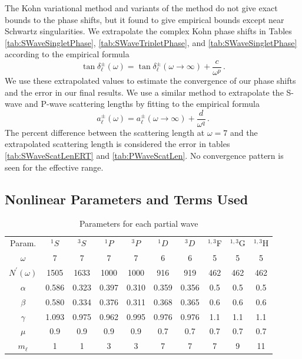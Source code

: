 \documentclass[preprint,showpacs,showkeys,preprintnumbers,amsmath,amssymb,longbibliography,pra,aps]{revtex4-1}
\begin{document}
The Kohn variational method and variants of the method do not give exact
bounds to the phase shifts, but it found to give empirical bounds except
near Schwartz singularities. We extrapolate the complex Kohn phase shifts
in Tables \ref{tab:SWaveSingletPhase}, \ref{tab:SWaveTripletPhase}, and
\ref{tab:SWaveSingletPhase} according to the empirical formula
\cite{Armour1991,VanReeth2003}
\begin{equation}
\label{eq:Extrap}
\tan\delta_\ell^\pm(\omega) = \tan\delta_\ell^\pm(\omega\to\infty) +
  \frac{c}{\omega^p}\, .
\end{equation}
We use these extrapolated values to estimate the convergence of our phase 
shifts and the error in our final results. We use a similar method to
extrapolate the S-wave and P-wave scattering lengths by fitting to the
empirical formula \cite{VanReeth2003}
\begin{equation}
\label{eq:ExtrapA}
a_\ell^\pm(\omega) = a_\ell^\pm(\omega\to\infty) + \frac{d}{\omega^q}\, .
\end{equation}
The percent difference between the scattering length at $\omega = 7$
and the extrapolated scattering 
length is considered the error in tables \ref{tab:SWaveScatLenERT} and
\ref{tab:PWaveScatLen}. No convergence pattern is seen for the effective range.

\subsection{Nonlinear Parameters and Terms Used}
\label{sec:Parameters}

\begin{table}[H]
  \centering
	\begin{ruledtabular}
    \begin{tabular}{cccccccccc}
    Param. & $^1S$ & $^3S$ & $^1P$ & $^3P$ & $^1D$ & $^3D$ & $^{1,3}$F & $^{1,3}$G & $^{1,3}$H \\
    \colrule
	$\omega$           & 7     & 7     & 7     & 7     & 6     & 6     & 5    & 5   & 5 \\
	$N^\prime(\omega)$ & 1505  & 1633  & 1000  & 1000  & 916   & 919   & 462  & 462 & 462 \\
	$\alpha$           & 0.586 & 0.323 & 0.397 & 0.310 & 0.359 & 0.356 & 0.5  & 0.5 & 0.5 \\
	$\beta$            & 0.580 & 0.334 & 0.376 & 0.311 & 0.368 & 0.365 & 0.6  & 0.6 & 0.6 \\
	$\gamma$           & 1.093 & 0.975 & 0.962 & 0.995 & 0.976 & 0.976 & 1.1  & 1.1 & 1.1 \\
	$\mu$              & 0.9   & 0.9   & 0.9   & 0.9   & 0.7   & 0.7   & 0.7  & 0.7 & 0.7 \\
	$m_\ell$           & 1     & 1     & 3     & 3     & 7     & 7     & 7    & 9   & 11 \\
    \end{tabular}
  \end{ruledtabular}
  \caption{Parameters for each partial wave}
  \label{tab:Nonlinear}
\end{table}
\end{document}
